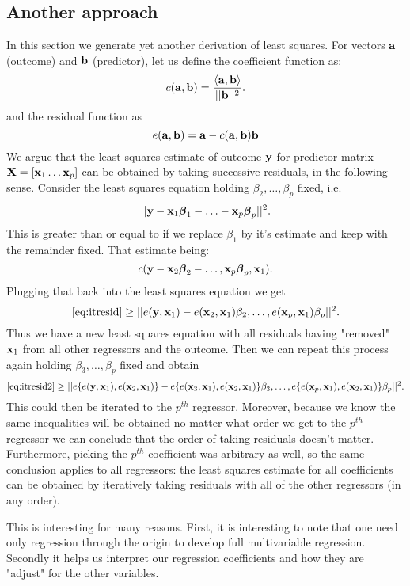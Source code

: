 \subsection{Another approach}

In this section we generate yet another derivation of least squares. 
For vectors $\mathbf{a}$ (outcome) and $\mathbf{b}$ (predictor), let us define the coefficient function as:
$$
c(\mathbf{a}, \mathbf{b})
= \frac{\langle \mathbf{a}, \mathbf{b} \rangle}{|| \mathbf{b} ||^2}.
$$
and the residual function as
$$
e(\mathbf{a}, \mathbf{b}) = \mathbf{a} - c(\mathbf{a}, \mathbf{b}) \mathbf{b}
$$
We argue that the least squares estimate of outcome
$\mathbf{y}$ for predictor matrix $\mathbf{X} = [\mathbf{x}_1 \ldots \mathbf{x}_p]$
can be obtained by taking successive residuals, in the following sense. Consider the least squares
equation holding $\beta_2, \ldots, \beta_p$ fixed, i.e.
\begin{equation}
\label{eq:itresid}
|| \mathbf{y} - \mathbf{x}_1 \boldsymbol{\beta}_1 - \ldots - \mathbf{x}_p \boldsymbol{\beta}_p||^2. 
\end{equation}
This is greater than or equal to if we replace $\beta_1$ by it's
estimate and keep with the remainder fixed. That estimate
being:
$$
c(\mathbf{y} - \mathbf{x}_2 \boldsymbol{\beta}_2 - \ldots, \mathbf{x}_p \boldsymbol{\beta}_p, \mathbf{x}_1).
$$
Plugging that back into the least squares equation we
get
\begin{equation}
\label{eq:itresid2}
\eqref{eq:itresid}\geq ||e(\mathbf{y}, \mathbf{x}_1) - 
e(\mathbf{x}_2, \mathbf{x}_1) \beta_2, \ldots, e(\mathbf{x}_p, \mathbf{x}_1) \beta_p||^2. \nonumber
\end{equation}
Thus we have a new least squares equation with 
all residuals having "removed" $\mathbf{x}_1$ from all other
regressors and the outcome. Then we can repeat this
process again holding $\beta_3, \ldots, \beta_p$
fixed and obtain
$$
\eqref{eq:itresid2}\geq ||e\{e(\mathbf{y}, \mathbf{x}_1), e(\mathbf{x}_2, \mathbf{x}_1)\} - 
e\{e(\mathbf{x}_3, \mathbf{x}_1), e(\mathbf{x}_2, \mathbf{x}_1)\} \beta_3, \ldots, e\{e(\mathbf{x}_p, \mathbf{x}_1), e(\mathbf{x}_{2}, \mathbf{x}_1)\} \beta_p||^2.
$$
This could then be iterated to the $p^{th}$ regressor.
Moreover, because we know the same inequalities will be
obtained no matter what order we get to the $p^{th}$
regressor we can conclude that the order of taking
residuals doesn't matter. Furthermore, picking the
$p^{th}$ coefficient was arbitrary as well, so the
same conclusion applies to all regressors: the
least squares estimate for all coefficients can be
obtained by iteratively taking residuals with all of the
other regressors (in any order). 

This is interesting for many reasons. First, it
is interesting to note that one need only 
regression through the origin to develop full
multivariable regression. Secondly it helps
us interpret our regression coefficients and
how they are "adjust" for the other variables.

